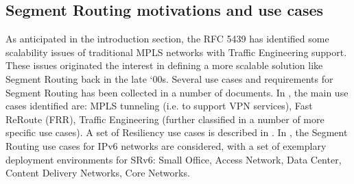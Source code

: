 \subsection{Segment Routing motivations and use cases}

As anticipated in the introduction section, the RFC 5439 \cite{rfc5439} has identified some scalability issues of traditional MPLS networks with Traffic Engineering support. These issues originated the interest in defining a more scalable solution like Segment Routing back in the late `00s. Several use cases and requirements for Segment Routing has been collected in a number of documents. In \cite{rfc7855}, the main use cases identified are: MPLS tunneling (i.e. to support VPN services), Fast ReRoute (FRR), Traffic Engineering (further classified in a number of more specific use cases). A set of Resiliency use cases is described in \cite{rfc8355}. In \cite{rfc8354}, the Segment Routing use cases for IPv6 networks are considered, with a set of exemplary deployment environments for SRv6: Small Office, Access Network, Data Center, Content Delivery Networks, Core Networks.

